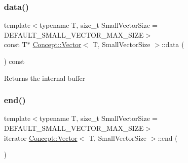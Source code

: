 \subsubsection{\texorpdfstring{data()}{data()}\hspace{0.1cm}{\footnotesize\ttfamily [2/2]}}
{\footnotesize\ttfamily template$<$typename T, size\+\_\+t Small\+Vector\+Size = D\+E\+F\+A\+U\+L\+T\+\_\+\+S\+M\+A\+L\+L\+\_\+\+V\+E\+C\+T\+O\+R\+\_\+\+M\+A\+X\+\_\+\+S\+I\+ZE$>$ \\
const T$\ast$ \mbox{\hyperlink{class_concept_1_1_vector}{Concept\+::\+Vector}}$<$ T, Small\+Vector\+Size $>$\+::data (\begin{DoxyParamCaption}{ }\end{DoxyParamCaption}) const\hspace{0.3cm}{\ttfamily [inline]}}

\begin{DoxyReturn}{Returns}
the internal buffer 
\end{DoxyReturn}
\mbox{\label{class_concept_1_1_vector_acf6f0b48aa0ecbd09e327d6b173d9ed8}} 
\subsubsection{\texorpdfstring{end()}{end()}\hspace{0.1cm}{\footnotesize\ttfamily [1/2]}}
{\footnotesize\ttfamily template$<$typename T, size\+\_\+t Small\+Vector\+Size = D\+E\+F\+A\+U\+L\+T\+\_\+\+S\+M\+A\+L\+L\+\_\+\+V\+E\+C\+T\+O\+R\+\_\+\+M\+A\+X\+\_\+\+S\+I\+ZE$>$ \\
iterator \mbox{\hyperlink{class_concept_1_1_vector}{Concept\+::\+Vector}}$<$ T, Small\+Vector\+Size $>$\+::end (\begin{DoxyParamCaption}{ }\end{DoxyParamCaption})\hspace{0.3cm}{\ttfamily [inline]}}

